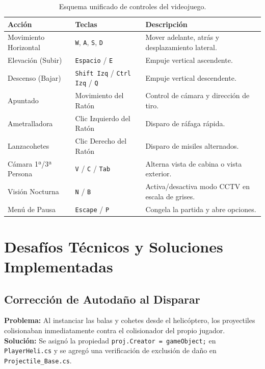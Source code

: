 \documentclass[12pt,a4paper]{article}
\begin{document}
\begin{table}[h!]
\centering
\small
\begin{tabular}{@{}lll@{}}
\toprule
\textbf{Acción} & \textbf{Teclas} & \textbf{Descripción} \\ \midrule
Movimiento Horizontal & \texttt{W}, \texttt{A}, \texttt{S}, \texttt{D} & Mover adelante, atrás y desplazamiento lateral. \\
Elevación (Subir) & \texttt{Espacio} / \texttt{E} & Empuje vertical ascendente. \\
Descenso (Bajar) & \texttt{Shift Izq} / \texttt{Ctrl Izq} / \texttt{Q} & Empuje vertical descendente. \\
Apuntado & Movimiento del Ratón & Control de cámara y dirección de tiro. \\
Ametralladora & Clic Izquierdo del Ratón & Disparo de ráfaga rápida. \\
Lanzacohetes & Clic Derecho del Ratón & Disparo de misiles alternados. \\
Cámara 1ª/3ª Persona & \texttt{V} / \texttt{C} / \texttt{Tab} & Alterna vista de cabina o vista exterior. \\
Visión Nocturna & \texttt{N} / \texttt{B} & Activa/desactiva modo CCTV en escala de grises. \\
Menú de Pausa & \texttt{Escape} / \texttt{P} & Congela la partida y abre opciones. \\ \bottomrule
\end{tabular}
\caption{Esquema unificado de controles del videojuego.}
\end{table}

\section{Desafíos Técnicos y Soluciones Implementadas}

\subsection{Corrección de Autodaño al Disparar}
\textbf{Problema:} Al instanciar las balas y cohetes desde el helicóptero, los proyectiles colisionaban inmediatamente contra el colisionador del propio jugador. \\
\textbf{Solución:} Se asignó la propiedad \texttt{proj.Creator = gameObject;} en \texttt{PlayerHeli.cs} y se agregó una verificación de exclusión de daño en \texttt{Projectile\_Base.cs}.
\end{document}
